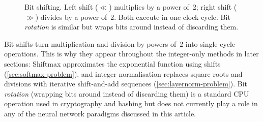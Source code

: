 \begin{figure}[htbp]
\centering
{}
\caption{Bit shifting. Left shift ($\ll$) multiplies by a power of~2;
  right shift ($\gg$) divides by a power of~2. Both execute in one
  clock cycle. Bit \emph{rotation} is similar but wraps bits around
  instead of discarding them.}
\label{fig:bitshift}
\end{figure}

\begin{engineernote}
Bit shifts turn multiplication and division by powers of~2 into
single-cycle operations. This is why they appear throughout the
integer-only methods in later sections: Shiftmax approximates the
exponential function using shifts (\cref{sec:softmax-problem}),
and integer normalisation replaces square roots and divisions with
iterative shift-and-add sequences
(\cref{sec:layernorm-problem}). Bit \emph{rotation} (wrapping
bits around instead of discarding them) is a standard CPU operation
used in cryptography and hashing but does not currently play a role
in any of the neural network paradigms discussed in this article.
\end{engineernote}


